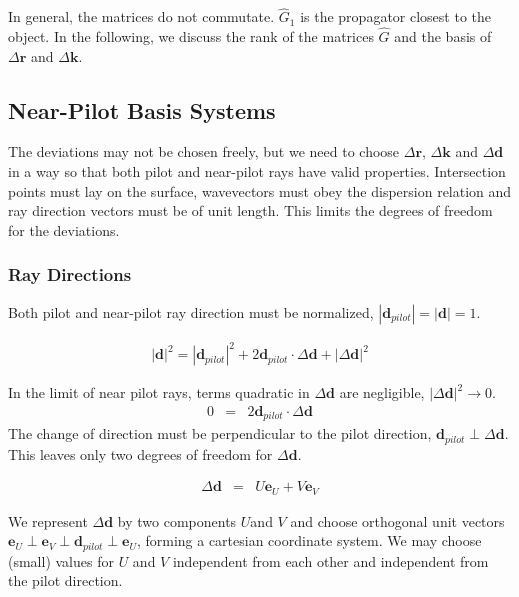 \documentclass[12pt,a4paper,twoside,openright,BCOR10mm,headsepline,titlepage,abstracton,chapterprefix,final]{scrreprt}
\newcommand\Vector[1]{{\mathbf{#1}}}
\newcommand\wavenumber{k}
\newcommand\Wavevector{\Vector{\wavenumber}}
\begin{document}
In general, the matrices do not commutate. $\hat{G}_1$ is the propagator closest to the object.
In the following, we discuss the rank of the matrices $\hat{G}$ and the basis of $\Delta \Vector{r}$ and $\Delta \Wavevector$.

\subsection{Near-Pilot Basis Systems}

The deviations may not be chosen freely, but we need to choose
$\Delta\Vector{r}$, $\Delta\Wavevector$ and $\Delta\Vector{d}$ 
in a way so that both pilot and near-pilot rays
have valid properties.
Intersection points must lay on the surface,
wavevectors must obey the dispersion relation 
and ray direction vectors must be of unit length.
This limits the degrees of freedom for the deviations.

\subsubsection{Ray Directions}

Both pilot and near-pilot ray direction must be normalized,
$|\Vector{d}_{pilot}|=|{\Vector{d}}|=1$.

\begin{eqnarray}
 |{\Vector{d}}|^2 = |\Vector{d}_{pilot}|^2 + 2 \Vector{d}_{pilot} \cdot \Delta\Vector{d} + |\Delta\Vector{d}|^2
\end{eqnarray}

In the limit of near pilot rays, terms quadratic in $\Delta\Vector{d}$ are negligible, $|\Delta\Vector{d}|^2 \rightarrow 0$. 
\begin{eqnarray}
0 &=& 2 \Vector{d}_{pilot} \cdot \Delta\Vector{d}
\end{eqnarray}
The change of direction must be perpendicular to the pilot direction, $\Vector{d}_{pilot} \perp \Delta\Vector{d}$. 
This leaves only two degrees of freedom for $\Delta\Vector{d}$.

\begin{eqnarray}
 \Delta\Vector{d} &=& U \Vector{e}_{U} + V \Vector{e}_{V}
\end{eqnarray}

We represent $\Delta\Vector{d}$ by two components $U$and $V$ 
and choose orthogonal unit vectors $\Vector{e}_{U} \perp \Vector{e}_{V} \perp \Vector{d}_{pilot} \perp \Vector{e}_{U}$,
forming a cartesian coordinate system.
We may choose (small) values for $U$ and $V$ independent from each other and independent from the pilot direction. 
\end{document}
